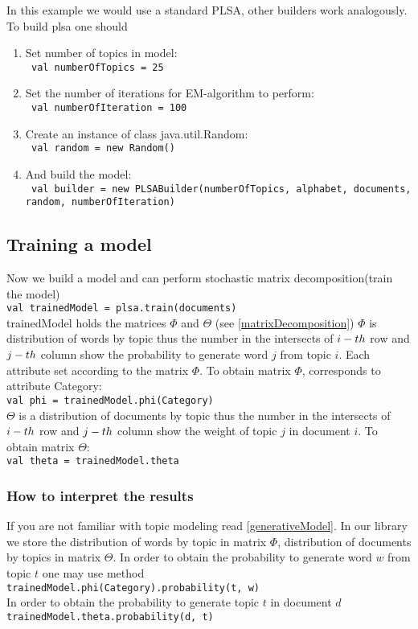     In this example we would
    use a standard PLSA, other builders work analogously.  To build plsa one should
    \begin{enumerate}
	\item Set number of topics in model: \\ \texttt{ val numberOfTopics = 25}
	\item Set the number of iterations for EM\--algorithm to perform: \\ \texttt{ val numberOfIteration = 100}
	\item Create an instance of class java.util.Random: \\     \texttt{ val random = new Random()}
	\item And build the model: \\ \texttt{ val builder = new PLSABuilder(numberOfTopics, alphabet, documents, random,  numberOfIteration)}
    \end{enumerate}

\subsection{Training a model}
    Now we build a model and can perform stochastic matrix decomposition(train the model) \\
    \texttt{val trainedModel = plsa.train(documents)}\\
    trainedModel holds the matrices $\Phi$ and $\Theta$ (see \ref{matrixDecomposition})
    $\Phi$ is distribution of words by topic thus the number in the intersects of $i\--th$ row and $j\--th$ column show the
    probability to generate word $j$ from topic $i$. Each attribute set according to the matrix $\Phi$.
    To obtain matrix $\Phi$, corresponds to attribute Category:\\
    \texttt{val phi = trainedModel.phi(Category)}\\
    $\Theta$ is a distribution of documents by topic thus the number in the intersects of $i\--th$ row and $j\--th$ column show
    the weight of topic $j$ in document $i$.
    To obtain matrix $\Theta$: \\
    \texttt{val theta = trainedModel.theta}\\

    \subsubsection{How to interpret the results}
	If you are not familiar with topic modeling read \ref{generativeModel}. In our library we store the distribution of words by topic in matrix $\Phi$,
	distribution of documents by topics in matrix $\Theta$. In order to obtain the probability to generate word $w$ from topic $t$ one may use method \\
	\texttt{trainedModel.phi(Category).probability(t, w)}\\
	In order to obtain the probability to generate topic $t$ in document $d$ \\
	\texttt{trainedModel.theta.probability(d, t)}\\
    
